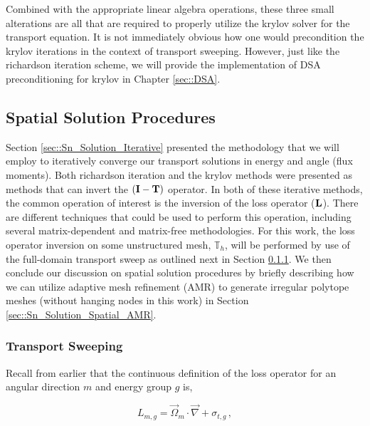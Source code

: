 Combined with the appropriate linear algebra operations, these three small alterations are all that are required to properly utilize the krylov solver for the transport equation. It is not immediately obvious how one would precondition the krylov iterations in the context of transport sweeping. However, just like the richardson iteration scheme, we will provide the implementation of DSA preconditioning for krylov in Chapter \ref{sec::DSA}.

\subsection{Spatial Solution Procedures}
\label{sec::Sn_Solution_Spatial}

Section \ref{sec::Sn_Solution_Iterative} presented the methodology that we will employ to iteratively converge our transport solutions in energy and angle (flux moments). Both richardson iteration and the krylov methods were presented as methods that can invert the $({\bf I} - {\bf T})$ operator. In both of these iterative methods, the common operation of interest is the inversion of the loss operator (${\bf L}$). There are different techniques that could be used to perform this operation, including several matrix-dependent and matrix-free methodologies. For this work, the loss operator inversion on some unstructured mesh, $\mathbb{T}_h$, will be performed by use of the full-domain transport sweep as outlined next in Section \ref{sec::Sn_Solution_Spatial_Sweeping}. We then conclude our discussion on spatial solution procedures by briefly describing how we can utilize adaptive mesh refinement (AMR) to generate irregular polytope meshes (without hanging nodes in this work) in Section \ref{sec::Sn_Solution_Spatial_AMR}.

\subsubsection{Transport Sweeping}
\label{sec::Sn_Solution_Spatial_Sweeping}

Recall from earlier that the continuous definition of the loss operator for an angular direction $m$ and energy group $g$ is,

\begin{equation}
\label{sec::Sn_Solution_Spatial_loss_op}
L_{m,g} =  \vec{\Omega}_m \cdot   \vec{\nabla} + \sigma_{t,g} \,  ,
\end{equation}

